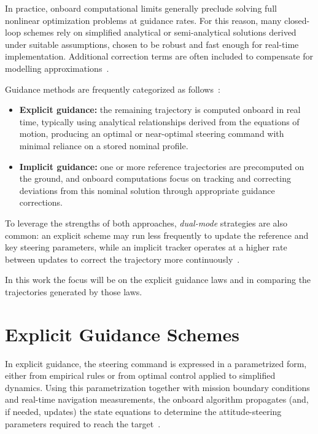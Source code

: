 In practice, onboard computational limits generally preclude solving full nonlinear optimization problems at guidance rates. For this reason, many closed-loop schemes rely on simplified analytical or semi-analytical solutions derived under suitable assumptions, chosen to be robust and fast enough for real-time implementation. Additional correction terms are often included to compensate for modelling approximations~\cite{BettsSurvey1998}.

Guidance methods are frequently categorized as follows~\cite{suresh2015integrated}:
\begin{itemize}
  \item \textbf{Explicit guidance:} the remaining trajectory is computed onboard in real time, typically using analytical relationships derived from the equations of motion, producing an optimal or near-optimal steering command with minimal reliance on a stored nominal profile.
  \item \textbf{Implicit guidance:} one or more reference trajectories are precomputed on the ground, and onboard computations focus on tracking and correcting deviations from this nominal solution through appropriate guidance corrections.
\end{itemize}

To leverage the strengths of both approaches, \emph{dual-mode} strategies are also common: an explicit scheme may run less frequently to update the reference and key steering parameters, while an implicit tracker operates at a higher rate between updates to correct the trajectory more continuously~\cite{suresh2015integrated}.

In this work the focus will be on the explicit guidance laws and in comparing the trajectories generated by those laws.


\section{Explicit Guidance Schemes}

In explicit guidance, the steering command is expressed in a parametrized form,
either from empirical rules or from optimal control applied to simplified dynamics. Using
this parametrization together with mission boundary conditions and real-time navigation
measurements, the onboard algorithm propagates (and, if needed, updates) the state
equations to determine the attitude-steering parameters required to reach the target~\cite{teofilatto2025trajectories}.

